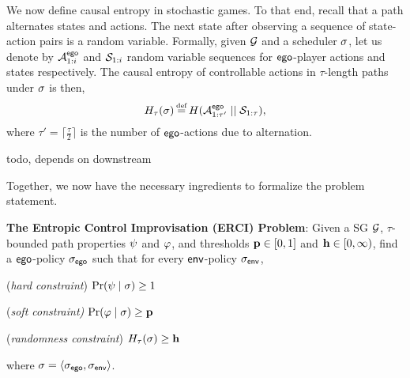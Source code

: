 {{{We now define causal entropy in stochastic games.
To that end, recall that a path alternates states and actions.  The
next state after observing a sequence of state-action pairs is a
random variable. Formally, given $\mathcal{G}$ and a scheduler 
$\sigma$, let us denote by ${\mathcal{A}}^{\mathsf{ego}}_{1:i}$ and
${\mathcal{S}}_{1:i}$ random variable sequences for
$\mathsf{ego}$-player actions and states respectively. The causal entropy of
controllable actions in $\tau$-length paths under $\sigma$ is then,
\begin{equation}
  H_\tau(\sigma) \eqdef H( \rv{A}^{\pOne}_{1:\tau'} \mid\mid \rv{S}_{1:\tau} ),
\end{equation}
where $\tau' = \lceil \frac{\tau}{2}\rceil$ is the number of $\mathsf{ego}$-actions due to alternation.



\begin{example}
	{\color{red}todo, depends on downstream}
\end{example}

Together, we now have the necessary ingredients to formalize the problem statement. 
\begin{mdframed}[backgroundcolor=blue!5]
\textbf{The Entropic Control Improvisation (ERCI) Problem}:
Given a SG $\mathcal{G}$, $\tau$-bounded path properties $\psi$ and $\varphi$, and thresholds $\mathbf{p} \in [0,1]$ and $\mathbf{h} \in [0,\infty)$, find a $\mathsf{ego}$-policy ${\sigma_{\mathsf{ego}}}$  such that for every $\mathsf{env}$-policy ${\sigma_{\mathsf{env}}}$,
\begin{compactenum}
	\item (\emph{hard constraint}) $\Pr(\psi \mid \sigma) \geq 1$
	\item (\emph{soft constraint)} $\Pr(\varphi \mid \sigma) \geq \mathbf{p}$
\item (\emph{randomness constraint}) $H_\tau(\sigma) \geq \mathbf{h}$
\end{compactenum}
where  $\sigma = \langle {\sigma_{\mathsf{ego}}}, {\sigma_{\mathsf{env}}} \rangle$.
\end{mdframed}

}}}
